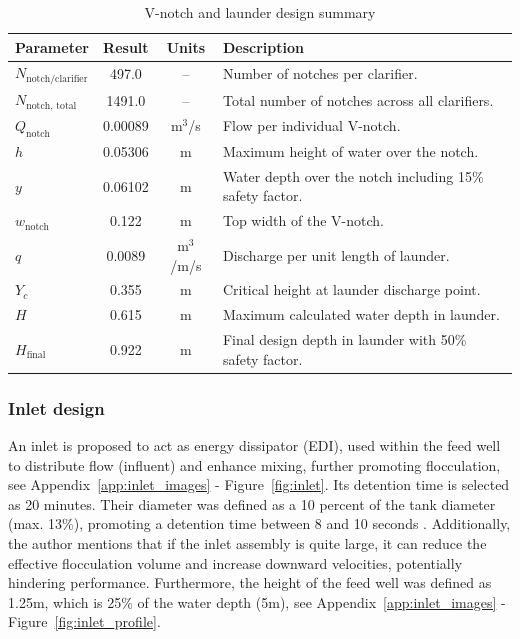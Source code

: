 \documentclass[11pt]{article}
\begin{document}
\begin{table}[h]
\centering
\caption{V-notch and launder design summary}
\label{tab:vnotch_results}
\renewcommand{\arraystretch}{1.4}
\begin{tabular}{|l|c|c|p{9.5cm}|}
\hline
\textbf{Parameter} & \textbf{Result} & \textbf{Units} & \textbf{Description} \\
\hline
$N_{\text{notch/clarifier}}$ & 
497.0
& -- & Number of notches per clarifier. \\
$N_{\text{notch, total}}$ &
1491.0
& -- & Total number of notches across all clarifiers. \\
$Q_{\text{notch}}$ &
0.00089
& m$^3$/s & Flow per individual V-notch. \\
$h$ &
0.05306
& m & Maximum height of water over the notch. \\
$y$ &
0.06102
& m & Water depth over the notch including 15\% safety factor. \\
$w_{\text{notch}}$ &
0.122
& m & Top width of the V-notch. \\
$q$ &
0.0089
& m$^3$/m/s & Discharge per unit length of launder. \\
$Y_c$ &
0.355
& m & Critical height at launder discharge point. \\
$H$ &
0.615
& m & Maximum calculated water depth in launder. \\
$H_{\text{final}}$ &
0.922
& m & Final design depth in launder with 50\% safety factor. \\
\hline
\end{tabular}
\end{table}

\subsubsection{Inlet design}
\label{sec:inlet_design}

An inlet is proposed to act as energy dissipator (EDI), 
used within the feed well to distribute flow (influent) and 
enhance mixing, further promoting flocculation, see Appendix~\ref{app:inlet_images} - Figure~\ref{fig:inlet}. 
Its detention time is selected as 20 minutes. Their diameter was defined as a 10 percent of the tank diameter (max. 13\%), 
promoting a detention time between 8 and 10 seconds \cite{metcalf_2014_wastewater}. 
Additionally, the author mentions that if the inlet assembly is quite large, it 
can reduce the effective flocculation volume and increase downward velocities, 
potentially hindering performance. Furthermore, the height of the feed well was defined as 1.25m, which is 25\% of the water depth (5m),
see Appendix~\ref{app:inlet_images} - Figure~\ref{fig:inlet_profile}.
\end{document}

